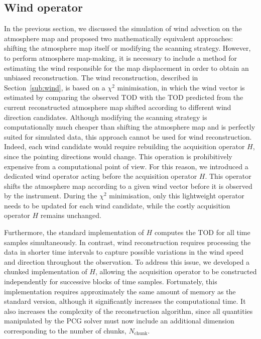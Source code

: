 \documentclass[../../thesis.tex]{subfiles}
\begin{document}
\subsection{Wind operator} \label{sub:wind_operator}

In the previous section, we discussed the simulation of wind advection on the atmosphere map and proposed two mathematically equivalent approaches: shifting the atmosphere map itself or modifying the scanning strategy. However, to perform atmosphere map-making, it is necessary to include a method for estimating the wind responsible for the map displacement in order to obtain an unbiased reconstruction.
The wind reconstruction, described in Section~\ref{sub:wind}, is based on a $\chi^2$ minimisation, in which the wind vector is estimated by comparing the observed TOD with the TOD predicted from the current reconstructed atmosphere map shifted according to different wind direction candidates.
Although modifying the scanning strategy is computationally much cheaper than shifting the atmosphere map and is perfectly suited for simulated data, this approach cannot be used for wind reconstruction. Indeed, each wind candidate would require rebuilding the acquisition operator $H$, since the pointing directions would change. This operation is prohibitively expensive from a computational point of view.
For this reason, we introduced a dedicated wind operator acting before the acquisition operator $H$. This operator shifts the atmosphere map according to a given wind vector before it is observed by the instrument. During the $\chi^2$ minimisation, only this lightweight operator needs to be updated for each wind candidate, while the costly acquisition operator $H$ remains unchanged.

Furthermore, the standard implementation of $H$ computes the TOD for all time samples simultaneously. In contrast, wind reconstruction requires processing the data in shorter time intervals to capture possible variations in the wind speed and direction throughout the observation. To address this issue, we developed a chunked implementation of $H$, allowing the acquisition operator to be constructed independently for successive blocks of time samples. Fortunately, this implementation requires approximately the same amount of memory as the standard version, although it significantly increases the computational time. It also increases the complexity of the reconstruction algorithm, since all quantities manipulated by the PCG solver must now include an additional dimension corresponding to the number of chunks, $N_{\mathrm{chunk}}$.
\end{document}
